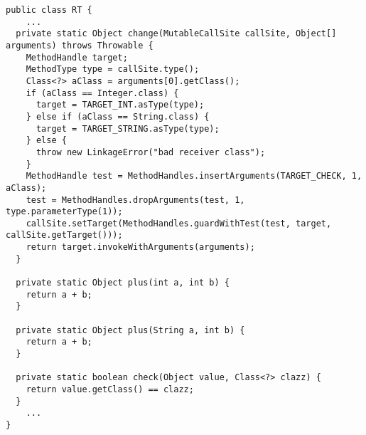 {\tiny \begin{verbatim}
public class RT {
    ...
  private static Object change(MutableCallSite callSite, Object[] arguments) throws Throwable {
    MethodHandle target;
    MethodType type = callSite.type();
    Class<?> aClass = arguments[0].getClass();
    if (aClass == Integer.class) {
      target = TARGET_INT.asType(type);
    } else if (aClass == String.class) {
      target = TARGET_STRING.asType(type);
    } else {
      throw new LinkageError("bad receiver class");
    }
    MethodHandle test = MethodHandles.insertArguments(TARGET_CHECK, 1, aClass);
    test = MethodHandles.dropArguments(test, 1, type.parameterType(1));
    callSite.setTarget(MethodHandles.guardWithTest(test, target, callSite.getTarget()));
    return target.invokeWithArguments(arguments);
  }

  private static Object plus(int a, int b) {
    return a + b;
  }

  private static Object plus(String a, int b) {
    return a + b;
  }

  private static boolean check(Object value, Class<?> clazz) {
    return value.getClass() == clazz;
  }
    ...
}
\end{verbatim} }